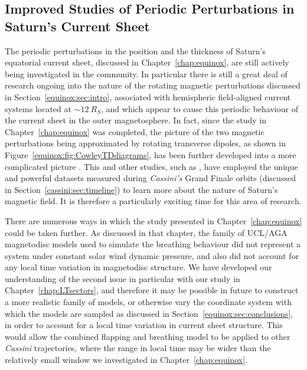 \subsection{Improved Studies of Periodic Perturbations in Saturn's Current Sheet}\label{conclusions:sec:perturbations}
The periodic perturbations in the position and the thickness of Saturn's equatorial current sheet, discussed in Chapter~\ref{chap:equinox}, are still actively being investigated in the community. In particular there is still a great deal of research ongoing into the nature of the rotating magnetic perturbations discussed in Section~\ref{equinox:sec:intro}, associated with hemispheric field-aligned current systems located at ${\sim}\SI{12}{R_S}$, and which appear to cause this periodic behaviour of the current sheet in the outer magnetosphere. In fact, since the study in Chapter~\ref{chap:equinox} was completed, the picture of the two magnetic perturbations being approximated by rotating transverse dipoles, as shown in Figure~\ref{equinox:fig:CowleyTDdiagrams}, has been further developed into a more complicated picture \citep[][Figure 13]{provan2018}. This and other studies, such as \citet{dougherty2018}, have employed the unique and powerful datasets measured during \textit{Cassini's} Grand Finale orbits (discussed in Section~\ref{cassini:sec:timeline}) to learn more about the nature of Saturn's magnetic field. It is therefore a particularly exciting time for this area of research.

There are numerous ways in which the study presented in Chapter~\ref{chap:equinox} could be taken further. As discussed in that chapter, the family of UCL/AGA magnetodisc models used  to simulate the breathing behaviour did not represent a system under constant solar wind dynamic pressure, and also did not account for any local time variation in magnetodisc structure. We have developed our understanding of the second issue  in particular with our study in Chapter~\ref{chap:LTsectors}, and therefore it may be possible in future to construct a more realistic family  of models, or otherwise vary the coordinate system with which the models are sampled as discussed in Section~\ref{equinox:sec:conclusions}, in order to account for a local time variation in current sheet structure. This would allow the combined flapping and breathing model to be applied to other \textit{Cassini} trajectories, where the range in local time may be wider than the relatively small window we investigated in Chapter~\ref{chap:equinox}.

